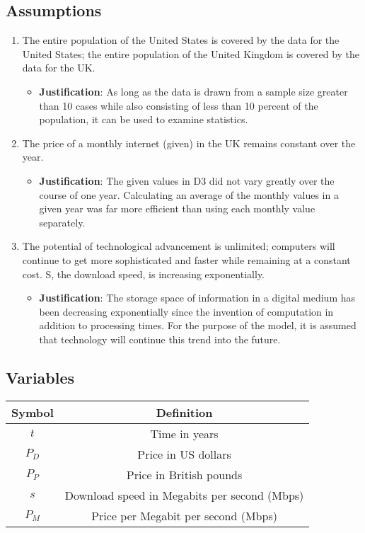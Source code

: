 	\subsection{Assumptions}
	\begin{enumerate}
   \item The entire population of the United States is covered by the data for the United States; the entire population of the United Kingdom is covered by the data for the UK.
   \begin{itemize}
     \item \textbf{Justification}: As long as the data is drawn from a sample size greater than 10 cases while also consisting of less than 10 percent of the population, it can be used to examine statistics.
   \end{itemize}
   \item The price of a monthly internet (given) in the UK remains constant over the year.
   \begin{itemize}
     \item \textbf{Justification}: The given values in D3 did not vary greatly over the course of one year. Calculating an average of the monthly values in a given year was far more efficient than using each monthly value separately.
   \end{itemize}
   \item The potential of technological advancement is unlimited; computers will continue to get more sophisticated and faster while remaining at a constant cost. S, the download speed, is increasing exponentially.
   \begin{itemize}
     \item \textbf{Justification}: The storage space of information in a digital medium has been decreasing exponentially since the invention of computation in addition to processing times. For the purpose of the model, it is assumed that technology will continue this trend into the future.
   \end{itemize}
\end{enumerate}

	\subsection{Variables}

	\begin{center} \begin{tabular} {|c|c|}
		\hline
		Symbol & Definition \\
		\hline
		$t$ & Time in years\\
		\hline
		$P_D$ & Price in US dollars \\
		\hline
		$P_P$ & Price in British pounds \\
		\hline
		$s$ & Download speed in Megabits per second (Mbps) \\
		\hline
		$P_M$ & Price per Megabit per second (Mbps) \\
		\hline
	\end{tabular} \end{center}


